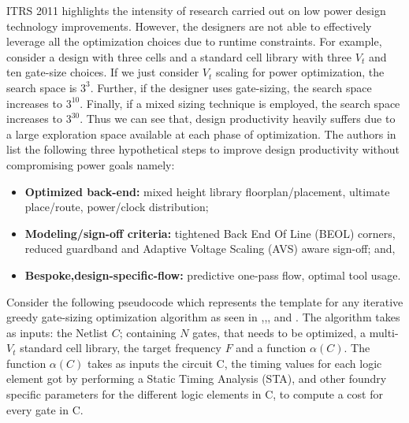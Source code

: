 \indent ITRS 2011 \cite{itrs:2011} highlights the intensity of research carried out on low power design technology improvements. However, the designers are not able to effectively leverage all the optimization choices due to runtime constraints. For example, consider a design with three cells and a standard cell library with three $V_t$ and ten gate-size choices. If we just consider $V_t$ scaling for power optimization, the search space is $3^3$. Further, if the designer uses gate-sizing, the search space increases to $3^{10}$. Finally, if a mixed sizing technique is employed, the search space increases to $3^{30}$. Thus we can see that, design productivity heavily suffers due to a large exploration space available at each phase of optimization. The authors in  \cite{kahngtalk} list the following three hypothetical steps to improve design productivity without compromising power goals namely:  \begin{itemize}
    \item  \textbf{Optimized back-end:} mixed height library floorplan/placement, ultimate place/route, power/clock distribution;
    \item  \textbf{Modeling/sign-off criteria:} tightened Back End Of Line (BEOL) corners, reduced guardband and Adaptive Voltage Scaling (AVS) aware sign-off; and,
    \item  \textbf{Bespoke,design-specific-flow:} predictive one-pass flow, optimal tool usage.
 \end{itemize} 
 Consider the following pseudocode which represents the template for any iterative greedy gate-sizing optimization algorithm as seen in \cite{hu:12},\cite{hu:13},\cite{mok:12}, and \cite{reiman:13}. The algorithm takes as inputs: the Netlist $C$; containing $N$ gates, that needs to be optimized, a multi-$V_t$ standard cell library, the target frequency $F$ and a function $\alpha(C)$. The function $\alpha(C)$ takes as inputs the circuit C, the timing values for each logic element got by performing a Static Timing Analysis (STA), and other foundry specific parameters for the different logic elements in C, to compute a cost for every gate in C.

